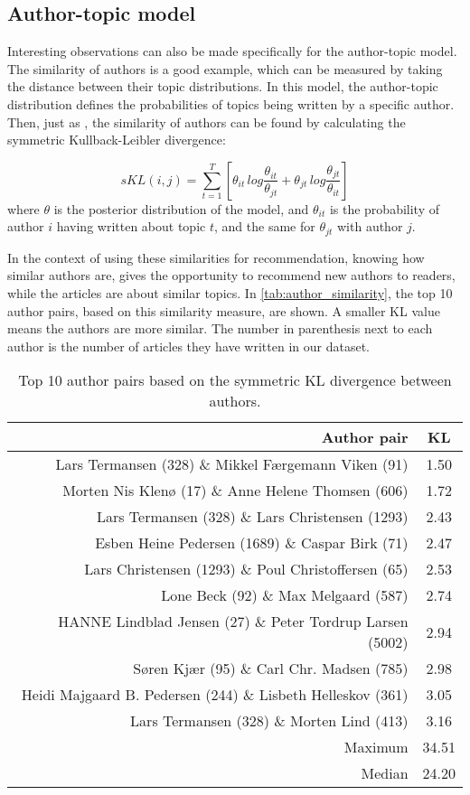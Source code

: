 \subsection{Author-topic model}\label{sec:discussion_author_topic}
Interesting observations can also be made specifically for the author-topic model.
The similarity of authors is a good example, which can be measured by taking the distance between their topic distributions.
In this model, the author-topic distribution defines the probabilities of topics being written by a specific author.
Then, just as \citet{author_topic_2012}, the similarity of authors can be found by calculating the symmetric Kullback-Leibler divergence:

\begin{equation} \label{eq:author_similarity}
	sKL(i,j) = \sum_{t=1}^{T}\left[\theta_{it}\, log \frac{\theta_{it}}{\theta_{jt}} + \theta_{jt}\, log \frac{\theta_{jt}}{\theta_{it}}\right]
\end{equation}
\noindent where $\theta$ is the posterior distribution of the model, and $\theta_{it}$ is the probability of author $i$ having written about topic $t$, and the same for $\theta_{jt}$ with author $j$.

In the context of using these similarities for recommendation, knowing how similar authors are, gives the opportunity to recommend new authors to readers, while the articles are about similar topics.
In \autoref{tab:author_similarity}, the top 10 author pairs, based on this similarity measure, are shown.
A smaller KL value means the authors are more similar.
The number in parenthesis next to each author is the number of articles they have written in our dataset.

\begin{table}[h]
	\centering
	\caption{Top 10 author pairs based on the symmetric KL divergence between authors.}
	\begin{tabular}{r|c}
		Author pair & KL \\
		\midrule
		Lars Termansen (328) \& Mikkel Færgemann Viken (91) & 1.50 \\
		Morten Nis Klenø (17) \& Anne Helene Thomsen (606) & 1.72 \\
		Lars Termansen (328) \& Lars Christensen (1293) & 2.43 \\
		Esben Heine Pedersen (1689) \& Caspar Birk (71) & 2.47 \\
		Lars Christensen (1293) \& Poul Christoffersen (65) & 2.53 \\
		Lone Beck (92) \& Max Melgaard (587) & 2.74 \\
		HANNE Lindblad Jensen (27) \& Peter Tordrup Larsen (5002) & 2.94 \\
		Søren Kjær (95) \& Carl Chr. Madsen (785) & 2.98 \\
		Heidi Majgaard B. Pedersen (244) \& Lisbeth Helleskov (361) & 3.05 \\
		Lars Termansen (328) \& Morten Lind (413) & 3.16 \\
		\midrule
		Maximum & 34.51 \\
		Median & 24.20 \\
	\end{tabular}
	\label{tab:author_similarity}
\end{table}

